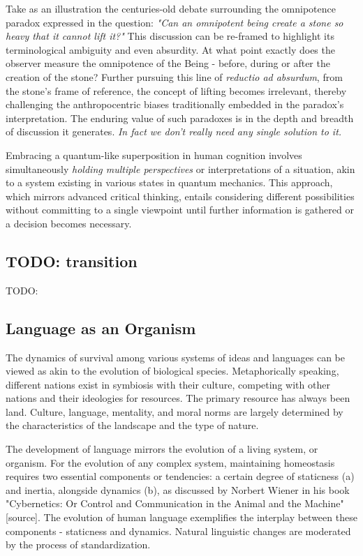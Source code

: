 \documentclass[11pt,a4]{article}
\begin{document}
        Take as an illustration the centuries-old debate surrounding the
        omnipotence paradox expressed in the question: \textit{"Can an omnipotent being create a stone so heavy that it cannot lift it?"} This discussion can be re-framed to highlight its terminological ambiguity and even absurdity.
        At what point exactly does the observer measure the omnipotence of the Being - before, during or after the creation of the stone?
        Further pursuing this line of \textit{reductio ad absurdum}, from the stone's frame of reference, the concept of lifting becomes irrelevant, thereby challenging the anthropocentric biases traditionally embedded in the paradox’s interpretation.
        The enduring value of such paradoxes is in the depth and breadth of discussion it generates. \textit{In fact we don't really need any single solution to it.}
        \par

        Embracing a quantum-like superposition in human cognition involves simultaneously \textit{holding multiple perspectives} or interpretations of a situation, akin to a system existing in various states in quantum mechanics. This approach, which mirrors advanced critical thinking, entails considering different possibilities without committing to a single viewpoint until further information is gathered or a decision becomes necessary.

\subsection{TODO: transition}
TODO:

\subsection{Language as an Organism}
    The dynamics of survival among various systems of ideas and languages can be viewed as akin to the evolution of biological species. Metaphorically speaking, different nations exist in symbiosis with their culture, competing with other nations and their ideologies for resources.
    The primary resource has always been land. Culture, language, mentality, and moral norms are largely determined by the characteristics of the landscape and the type of nature.

    \par
    The development of language mirrors the evolution of a living system, or organism. For the evolution of any complex system, maintaining homeostasis requires two essential components or tendencies: a certain degree of staticness (a) and inertia, alongside dynamics (b), as discussed by Norbert Wiener in his book "Cybernetics: Or Control and Communication in the Animal and the Machine" [source]. The evolution of human language exemplifies the interplay between these components - staticness and dynamics. Natural linguistic changes are moderated by the process of standardization.
\end{document}
